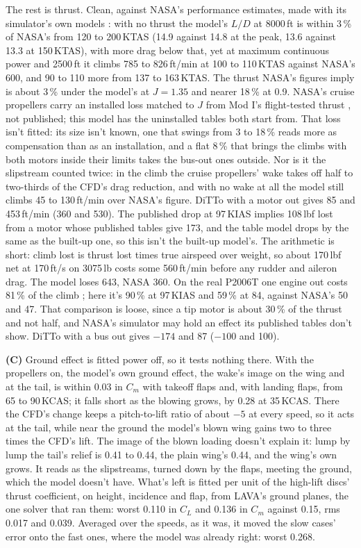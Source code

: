 \documentclass[10pt,a4paper,twocolumn]{article}
\begin{document}
The rest is thrust. Clean, against NASA's performance estimates, made with its simulator's own models \cite{perf}: with no thrust the model's $L/D$ at 8000\,ft is within 3\,\% of NASA's from 120 to 200\,KTAS (14.9 against 14.8 at the peak, 13.6 against 13.3 at 150\,KTAS), with more drag below that, yet at maximum continuous power and 2500\,ft it climbs 785 to 826\,ft/min at 100 to 110\,KTAS against NASA's 600, and 90 to 110 more from 137 to 163\,KTAS. The thrust NASA's figures imply is about 3\,\% under the model's at $J=1.35$ and nearer 18\,\% at 0.9. NASA's cruise propellers carry an installed loss matched to $J$ from Mod I's flight-tested thrust \cite{perf}, not published; this model has the uninstalled tables both start from. That loss isn't fitted: its size isn't known, one that swings from 3 to 18\,\% reads more as compensation than as an installation, and a flat 8\,\% that brings the climbs with both motors inside their limits takes the bus-out ones outside. Nor is it the slipstream counted twice: in the climb the cruise propellers' wake takes off half to two-thirds of the CFD's drag reduction, and with no wake at all the model still climbs 45 to 130\,ft/min over NASA's figure. DiTTo with a motor out gives 85 and 453\,ft/min (360 and 530). The published drop at 97\,KIAS implies 108\,lbf lost from a motor whose published tables give 173, and the table model drops by the same as the built-up one, so this isn't the built-up model's. The arithmetic is short: climb lost is thrust lost times true airspeed over weight, so about 170\,lbf net at 170\,ft/s on 3075\,lb costs some 560\,ft/min before any rudder and aileron drag. The model loses 643, NASA 360. On the real P2006T one engine out costs 81\,\% of the climb \cite{afm}; here it's 90\,\% at 97\,KIAS and 59\,\% at 84, against NASA's 50 and 47. That comparison is loose, since a tip motor is about 30\,\% of the thrust and not half, and NASA's simulator may hold an effect its published tables don't show. DiTTo with a bus out gives $-174$ and 87 ($-100$ and 100).

\textbf{(C)} Ground effect is fitted power off, so it tests nothing there. With the propellers on, the model's own ground effect, the wake's image on the wing and at the tail, is within 0.03 in $C_m$ with takeoff flaps and, with landing flaps, from 65 to 90\,KCAS; it falls short as the blowing grows, by 0.28 at 35\,KCAS. There the CFD's change keeps a pitch-to-lift ratio of about $-5$ at every speed, so it acts at the tail, while near the ground the model's blown wing gains two to three times the CFD's lift. The image of the blown loading doesn't explain it: lump by lump the tail's relief is 0.41 to 0.44, the plain wing's 0.44, and the wing's own grows. It reads as the slipstreams, turned down by the flaps, meeting the ground, which the model doesn't have. What's left is fitted per unit of the high-lift discs' thrust coefficient, on height, incidence and flap, from LAVA's ground planes, the one solver that ran them: worst 0.110 in $C_L$ and 0.136 in $C_m$ against 0.15, rms 0.017 and 0.039. Averaged over the speeds, as it was, it moved the slow cases' error onto the fast ones, where the model was already right: worst 0.268.
\end{document}

